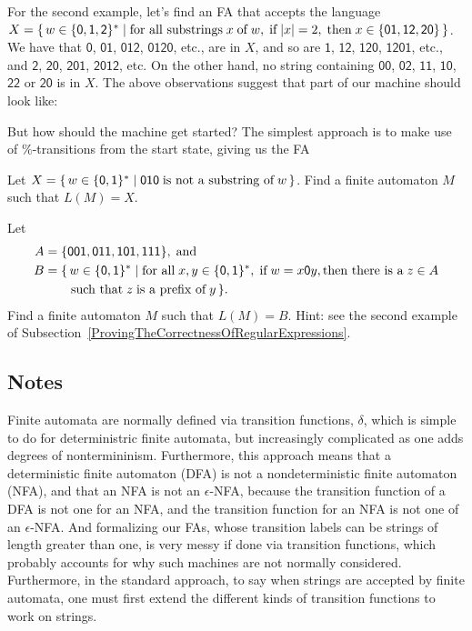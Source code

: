 For the second example, let's find an FA that accepts the language
$X=\{ \, w\in\mathsf{\{0,1,2\}^*} \mid \allowbreak\mbox{for all substrings}\allowbreak\;x
  \;\allowbreak\mbox{of}\allowbreak\;w,\;\allowbreak\mbox{if}\allowbreak\;|x|=2,\;\allowbreak\mbox{then}\allowbreak\;x\in\{\mathsf{01,12,20}\} \, \}$.
We have that $\mathsf{0}$, $\mathsf{01}$, $\mathsf{012}$,
$\mathsf{0120}$, etc., are in $X$, and so are $\mathsf{1}$,
$\mathsf{12}$, $\mathsf{120}$, $\mathsf{1201}$, etc., and
$\mathsf{2}$, $\mathsf{20}$, $\mathsf{201}$, $\mathsf{2012}$, etc.  On
the other hand, no string containing $\mathsf{00}$, $\mathsf{02}$,
$\mathsf{11}$, $\mathsf{10}$, $\mathsf{22}$ or $\mathsf{20}$ is in
$X$.  The above observations suggest that part of our machine should
look like:
\begin{center}

\end{center}
But how should the machine get started?  The simplest approach is to
make use of $\%$-transitions from the start state, giving us
the FA
\begin{center}

\end{center}

\begin{exercise}
Let $X=\{ \, w\in\{\mathsf{0,1}\}^* \mid \mathsf{010}\;\allowbreak\mbox{is not a
    substring of}\allowbreak\;w \, \}$.  Find a finite automaton $M$ such that $L(M)=X$.
\end{exercise}

\begin{exercise}
Let
\begin{align*}
A &=\{\mathsf{001, 011, 101, 111}\} , \;\allowbreak\mbox{and}\allowbreak\; \\
B &=\{\,w\in\{\mathsf{0,1}\}^* \mid \allowbreak\mbox{for all}\allowbreak\;x,y\in\{\mathsf{0,1}\}^*,
\;\allowbreak\mbox{if}\allowbreak\;w=x\mathsf{0} y, \allowbreak\mbox{then there is a}\allowbreak\; z\in A \\
&\quad\;\;\; \;\allowbreak\mbox{such that}\allowbreak\; z\;\allowbreak\mbox{is a prefix of}\allowbreak\; y\,\}.
\end{align*}
Find a finite automaton $M$ such that $L(M)=B$.  Hint: see the second
example of Subsection~\ref{ProvingTheCorrectnessOfRegularExpressions}.
\end{exercise}

%

\subsection{Notes}

Finite automata are normally defined via transition functions,
$\delta$, which is simple to do for deterministric finite automata,
but increasingly complicated as one adds degrees of nontermininism.
Furthermore, this approach means that a deterministic finite automaton
(DFA) is not a nondeterministic finite automaton (NFA), and that an
NFA is not an $\epsilon$-NFA, because the transition function of a DFA
is not one for an NFA, and the transition function for an NFA is not
one of an $\epsilon$-NFA.  And formalizing our FAs, whose transition
labels can be strings of length greater than one, is very messy if
done via transition functions, which probably accounts for why such
machines are not normally considered.  Furthermore, in the standard
approach, to say when strings are accepted by finite automata, one must
first extend the different kinds of transition functions to work on
strings.


